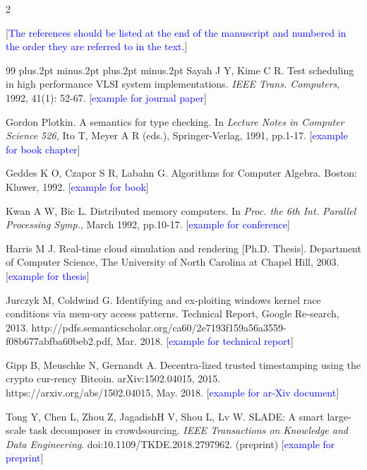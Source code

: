 \documentclass[twoside]{article}
\begin{document}
\begin{multicols}{2}
\vspace{2mm}

[\textcolor{blue}{The references should be listed at the end of the manuscript and numbered in the order they are referred to in the text.}]

\begin{thebibliography}{99}
\footnotesize
\itemsep=-3pt plus.2pt minus.2pt
\baselineskip=13pt plus.2pt minus.2pt
Sayah J Y, Kime C R. Test scheduling in high performance VLSI system implementations. {\it IEEE Trans. Computers}, 1992, 41(1): 52-67. [\textcolor{blue}{example for journal paper}]

 Gordon Plotkin. A semantics for type checking. In {\it Lecture Notes in Computer Science 526,} Ito T, Meyer A R (eds.), Springer-Verlag, 1991, pp.1-17. [\textcolor{blue}{example for book chapter}]

 Geddes K O, Czapor S R, Labahn G. Algorithms for Computer Algebra. Boston: Kluwer, 1992. [\textcolor{blue}{example for book}]

 Kwan A W, Bic L. Distributed memory computers. In {\it Proc. the 6th Int. Parallel Processing Symp.}, March 1992, pp.10-17. [\textcolor{blue}{example for conference}]

 Harris M J. Real-time cloud simulation and rendering [Ph.D. Thesis]. Department of Computer Science, The University of North Carolina at Chapel Hill, 2003. [\textcolor{blue}{example for thesis}]

 Jurczyk M, Coldwind G. Identifying and ex-ploiting windows kernel race conditions via mem-ory access patterns. Technical Report, Google Re-search, 2013. http://pdfs.semanticscholar.org/ca60/2e7193f159a56a3559-f08b677abfba60beb2.pdf, Mar. 2018. [\textcolor{blue}{example for technical report}]

 Gipp B, Meuschke N, Gernandt A. Decentra-lized trusted timestamping using the crypto cur-rency Bitcoin. arXiv:1502.04015, 2015. https://arxiv.org/abs/1502.04015, May. 2018. [\textcolor{blue}{example for ar-Xiv document}]

 Tong Y, Chen L, Zhou Z, JagadishH V, Shou L, Lv W. SLADE: A smart large-scale task decomposer in crowdsourcing. {\it IEEE Transactions on Knowledge and Data Engineering}. doi:10.1109/TKDE.2018.2797962. (preprint) [\textcolor{blue}{example for preprint}]

\end{thebibliography}

\label{last-page}
\end{multicols}
\label{last-page}
\end{document}
